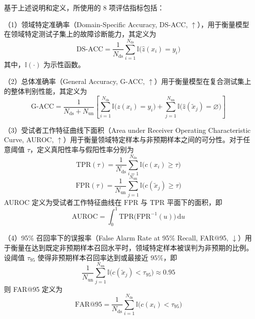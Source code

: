 基于上述说明和定义，所使用的 8 项评估指标包括：

（1）领域特定准确率（Domain-Specific Accuracy, DS-ACC, $\uparrow$），用于衡量模型在领域特定测试子集上的故障诊断能力，其定义为
\begin{equation}
\mathrm{DS\mbox{-}ACC}
=
\frac{1}{N_{\mathrm{ds}}}
\sum_{i=1}^{N_{\mathrm{ds}}}
\mathbb{I}\bigl(\hat{z}(x_i)=y_i\bigr)
\end{equation}
其中，$\mathbb{I}(\cdot)$ 为示性函数。

（2）总体准确率（General Accuracy, G-ACC, $\uparrow$）用于衡量模型在复合测试集上的整体判别性能，其定义为
\begin{equation}
\mathrm{G\mbox{-}ACC}
=
\frac{1}{N_{\mathrm{ds}}+N_{\mathrm{un}}}
\left[
\sum_{i=1}^{N_{\mathrm{ds}}}
\mathbb{I}\bigl(\hat{z}(x_i)=y_i\bigr)
+
\sum_{j=1}^{N_{\mathrm{un}}}
\mathbb{I}\bigl(\hat{z}(\tilde{x}_j)=\varnothing\bigr)
\right]
\end{equation}

（3）受试者工作特征曲线下面积（Area under Receiver Operating Characteristic Curve, AUROC, $\uparrow$）用于衡量领域特定样本与非预期样本之间的可分性。对于任意阈值 $\tau$，定义真阳性率与假阳性率分别为
\begin{equation}
\mathrm{TPR}(\tau)
=
\frac{1}{N_{\mathrm{ds}}}
\sum_{i=1}^{N_{\mathrm{ds}}}
\mathbb{I}\bigl(c(x_i)\ge \tau\bigr)
\end{equation}
\begin{equation}
\mathrm{FPR}(\tau)
=
\frac{1}{N_{\mathrm{un}}}
\sum_{j=1}^{N_{\mathrm{un}}}
\mathbb{I}\bigl(c(\tilde{x}_j)\ge \tau\bigr)
\end{equation}
AUROC 定义为受试者工作特征曲线在 $\mathrm{FPR}$ 与 $\mathrm{TPR}$ 平面下的面积，即
\begin{equation}
\mathrm{AUROC}
=
\int_{0}^{1}
\mathrm{TPR}\bigl(\mathrm{FPR}^{-1}(u)\bigr)\, \mathrm{d}u
\end{equation}

（4）95\% 召回率下的误报率（False Alarm Rate at 95\% Recall, FAR@95, $\downarrow$）用于衡量在达到既定非预期样本召回水平时，领域特定样本被误判为非预期的比例。设阈值 $\tau_{95}$ 使得非预期样本召回率达到或最接近 $95\%$，即
\begin{equation}
\frac{1}{N_{\mathrm{un}}}
\sum_{j=1}^{N_{\mathrm{un}}}
\mathbb{I}\bigl(c(\tilde{x}_j)<\tau_{95}\bigr)
\approx 0.95
\end{equation}
则 FAR@95 定义为
\begin{equation}
\mathrm{FAR@95}
=
\frac{1}{N_{\mathrm{ds}}}
\sum_{i=1}^{N_{\mathrm{ds}}}
\mathbb{I}\bigl(c(x_i)<\tau_{95}\bigr)
\end{equation}

